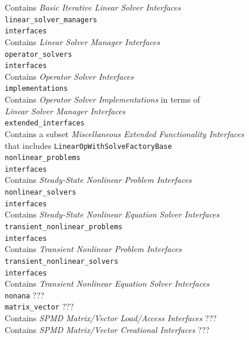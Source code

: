 \documentclass[pdf,ps2pdf,11pt]{SANDreport}
\begin{document}
\>\>\>\>\>\>\>\>Contains {}\textit{Basic Iterative Linear Solver Interfaces} \\
\>\>\>\>\>\>\texttt{linear\_solver\_managers} \\
\>\>\>\>\>\>\>\texttt{interfaces} \\
\>\>\>\>\>\>\>\>Contains {}\textit{Linear Solver Manager Interfaces} \\
\>\>\>\>\texttt{operator\_solvers} \\
\>\>\>\>\>\texttt{interfaces} \\
\>\>\>\>\>\>Contains {}\textit{Operator Solver Interfaces} \\
\>\>\>\>\>\texttt{implementations} \\
\>\>\>\>\>\>Contains {}\textit{Operator Solver Implementations} in terms of \\
\>\>\>\>\>\>\>{}\textit{Linear Solver Manager Interfaces} \\
\>\>\>\>\>\texttt{extended\_interfaces} \\
\>\>\>\>\>\>Contains a subset {}\textit{Miscellaneous Extended Functionality Interfaces} \\
\>\>\>\>\>\>\>that includes {}\texttt{LinearOpWithSolveFactoryBase} \\
\>\>\>\>\texttt{nonlinear\_problems} \\
\>\>\>\>\>\texttt{interfaces} \\
\>\>\>\>\>\>Contains {}\textit{Steady-State Nonlinear Problem Interfaces} \\
\>\>\>\>\texttt{nonlinear\_solvers} \\
\>\>\>\>\>\texttt{interfaces} \\
\>\>\>\>\>\>Contains {}\textit{Steady-State Nonlinear Equation Solver Interfaces} \\
\>\>\>\>\texttt{transient\_nonlinear\_problems} \\
\>\>\>\>\>\texttt{interfaces} \\
\>\>\>\>\>\>Contains {}\textit{Transient Nonlinear Problem Interfaces} \\
\>\>\>\>\texttt{transient\_nonlinear\_solvers} \\
\>\>\>\>\>\texttt{interfaces} \\
\>\>\>\>\>\>Contains {}\textit{Transient Nonlinear Equation Solver Interfaces} \\
\>\>\>\texttt{nonana} ??? \\
\>\>\>\>\texttt{matrix\_vector} ??? \\
\>\>\>\>\>Contains {}\textit{SPMD Matrix/Vector Load/Access Interfaces} ??? \\
\>\>\>\>\>Contains {}\textit{SPMD Matrix/Vector Creational Interfaces} ??? \\
\eifthen
\end{document}
